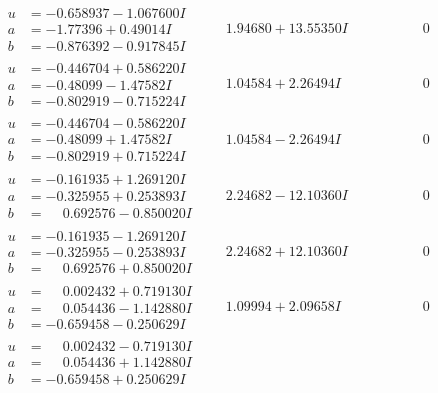 \documentclass[1p]{elsarticle_modified}
\theoremstyle{definition}
\begin{document}
$$\begin{array}{c|c|c}
\begin{aligned}
u &= -0.658937 - 1.067600 I \\
a &= -1.77396 + 0.49014 I \\
b &= -0.876392 - 0.917845 I\end{aligned}
 & \phantom{-}1.94680 + 13.55350 I & \phantom{-0.000000 } 0 \\ \hline\begin{aligned}
u &= -0.446704 + 0.586220 I \\
a &= -0.48099 - 1.47582 I \\
b &= -0.802919 - 0.715224 I\end{aligned}
 & \phantom{-}1.04584 + 2.26494 I & \phantom{-0.000000 } 0 \\ \hline\begin{aligned}
u &= -0.446704 - 0.586220 I \\
a &= -0.48099 + 1.47582 I \\
b &= -0.802919 + 0.715224 I\end{aligned}
 & \phantom{-}1.04584 - 2.26494 I & \phantom{-0.000000 } 0 \\ \hline\begin{aligned}
u &= -0.161935 + 1.269120 I \\
a &= -0.325955 + 0.253893 I \\
b &= \phantom{-}0.692576 - 0.850020 I\end{aligned}
 & \phantom{-}2.24682 - 12.10360 I & \phantom{-0.000000 } 0 \\ \hline\begin{aligned}
u &= -0.161935 - 1.269120 I \\
a &= -0.325955 - 0.253893 I \\
b &= \phantom{-}0.692576 + 0.850020 I\end{aligned}
 & \phantom{-}2.24682 + 12.10360 I & \phantom{-0.000000 } 0 \\ \hline\begin{aligned}
u &= \phantom{-}0.002432 + 0.719130 I \\
a &= \phantom{-}0.054436 - 1.142880 I \\
b &= -0.659458 - 0.250629 I\end{aligned}
 & \phantom{-}1.09994 + 2.09658 I & \phantom{-0.000000 } 0 \\ \hline\begin{aligned}
u &= \phantom{-}0.002432 - 0.719130 I \\
a &= \phantom{-}0.054436 + 1.142880 I \\
b &= -0.659458 + 0.250629 I\end{aligned}

\end{array}$$
\end{document}
